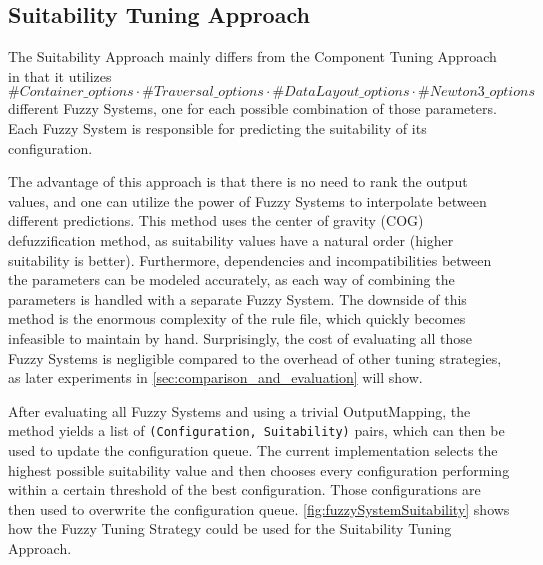 \subsection{Suitability Tuning Approach}

The Suitability Approach mainly differs from the Component Tuning Approach in that it utilizes $\#Container\_options \cdot \#Traversal\_options \cdot \#DataLayout\_options \cdot \#Newton3\_options$ different Fuzzy Systems, one for each possible combination of those parameters. Each Fuzzy System is responsible for predicting the suitability of its configuration.

The advantage of this approach is that there is no need to rank the output values, and one can utilize the power of Fuzzy Systems to interpolate between different predictions. This method uses the center of gravity (COG) defuzzification method, as suitability values have a natural order (higher suitability is better). Furthermore, dependencies and incompatibilities between the parameters can be modeled accurately, as each way of combining the parameters is handled with a separate Fuzzy System. The downside of this method is the enormous complexity of the rule file, which quickly becomes infeasible to maintain by hand. Surprisingly, the cost of evaluating all those Fuzzy Systems is negligible compared to the overhead of other tuning strategies, as later experiments in \autoref{sec:comparison_and_evaluation} will show.


After evaluating all Fuzzy Systems and using a trivial OutputMapping, the method yields a list of \texttt{(Configuration, Suitability)} pairs, which can then be used to update the configuration queue. The current implementation selects the highest possible suitability value and then chooses every configuration performing within a certain threshold of the best configuration. Those configurations are then used to overwrite the configuration queue. \autoref{fig:fuzzySystemSuitability} shows how the Fuzzy Tuning Strategy could be used for the Suitability Tuning Approach.

